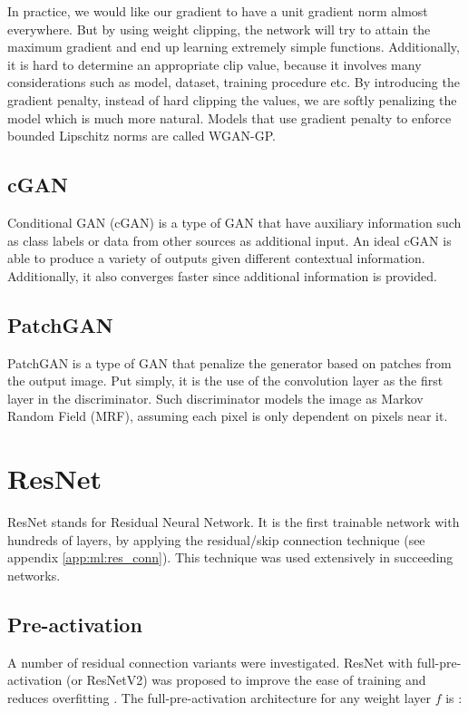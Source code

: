 In practice, we would like our gradient to have a unit gradient norm almost everywhere. But by using weight clipping, the network will try to attain the maximum gradient and end up learning extremely simple functions\cite{gulrajaniImprovedTrainingWasserstein2017}. Additionally, it is hard to determine an appropriate clip value, because it involves many considerations such as model, dataset, training procedure etc. By introducing the gradient penalty, instead of hard clipping the values, we are softly penalizing the model which is much more natural. Models that use gradient penalty to enforce bounded Lipschitz norms are called WGAN-GP.

\subsection{cGAN}
Conditional GAN (cGAN) is a type of GAN that have auxiliary information such as class labels or data from other sources as additional input. An ideal cGAN is able to produce a variety of outputs given different contextual information. Additionally, it also converges faster since additional information is provided.


\subsection{PatchGAN}
PatchGAN is a type of GAN that penalize the generator based on patches from the output image. Put simply, it is the use of the convolution layer as the first layer in the discriminator. Such discriminator models the image as Markov Random Field (MRF), assuming each pixel is only dependent on pixels near it.


\section{ResNet}
ResNet stands for Residual Neural Network. It is the first trainable network with hundreds of layers, by applying the residual/skip connection technique (see appendix \ref{app:ml:res_conn}). This technique was used extensively in succeeding networks.

\subsection{Pre-activation}
A number of residual connection variants were investigated. ResNet with full-pre-activation (or ResNetV2) was proposed to improve the ease of training and reduces overfitting \cite{heIdentityMappingsDeep2016a}. The full-pre-activation architecture for any weight layer $f$ is :


